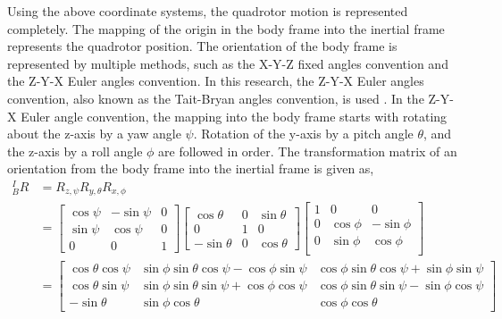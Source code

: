 Using the above coordinate systems, the quadrotor motion is represented completely. The mapping of the origin in the body frame into the inertial frame represents the quadrotor position. The orientation of the body frame is represented by multiple methods, such as the X-Y-Z fixed angles convention and the Z-Y-X Euler angles convention. In this research, the Z-Y-X Euler angles convention, also known as the Tait-Bryan angles convention, is used \cite{Diebel06}. In the Z-Y-X Euler angle convention, the mapping into the body frame starts with rotating about the z-axis by a yaw angle \(\psi\). Rotation of the y-axis by a pitch angle \(\theta\), and the z-axis by a roll angle \(\phi\) are followed in order. The transformation matrix of an orientation from the body frame into the inertial frame is given as,\\
\begin{equation}
\label{eq:transform_matrix}
\begin{aligned}
{^I _B}R
& = {R_{z, \psi}}  {R_{y, \theta}} {R_{x, \phi}}\\
& =
\begin{bmatrix}
\cos{\psi} & -\sin{\psi} & 0 \\
\sin{\psi} & \cos{\psi} & 0\\
0 & 0 & 1
\end{bmatrix}
\begin{bmatrix}
\cos{\theta} & 0& \sin{\theta} \\
0 & 1 & 0 \\
-\sin{\theta} & 0 & \cos{\theta}
\end{bmatrix}
\begin{bmatrix}
1 & 0 & 0\\
0& \cos{\phi} & -\sin{\phi} \\
0 & \sin{\phi} & \cos{\phi} \\
\end{bmatrix}\\
& =
\begin{bmatrix}
\cos{\theta} \cos{\psi} & \sin{\phi} \sin{\theta} \cos{\psi} - \cos{\phi}\sin{\psi} & \cos{\phi} \sin{\theta} \cos{\psi} + \sin{\phi} \sin{\psi}\\
\cos{\theta} \sin{\psi} & \sin{\phi} \sin{\theta} \sin{\psi} + \cos{\phi}\cos{\psi} & \cos{\phi} \sin{\theta} \sin{\psi} - \sin{\phi} \cos{\psi}\\
-\sin{\theta} &  \sin{\phi} \cos{\theta} & \cos{\phi} \cos{\theta}
\end{bmatrix}\\
\end{aligned}
\end{equation}
